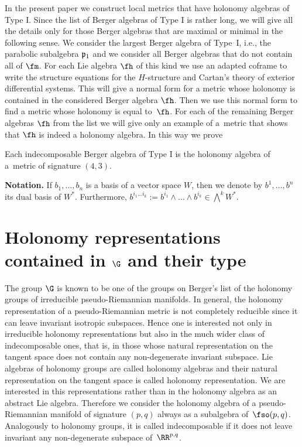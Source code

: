 In the present paper we construct local metrics that have holonomy algebras of Type I. Since the list of Berger algebras of Type I is rather long, we will give all the details only for those Berger algebras that are maximal or minimal in the following sense. We consider the largest Berger algebra of Type~I, i.e., the parabolic subalgebra $\frak p_1$ and we consider all Berger algebras that do not contain all of $\fm$. For each Lie algebra $\fh$ of this kind we use an adapted coframe to write the structure equations for the $H$-structure and Cartan's theory of exterior differential systems. This will give a normal form for a metric whose holonomy is contained in the considered Berger algebra $\fh$. Then we use this normal form to find a metric whose holonomy is equal to~$\fh$. For each of the remaining Berger algebras $\fh$ from the list we will give only an example of a~metric that shows that $\fh$ is indeed a holonomy algebra. In this way we prove
\begin{Theorem}\label{T}
Each indecomposable Berger algebra of Type I is the holonomy algebra of a~metric of signature $(4,3)$.
\end{Theorem}

\noindent
{\bf Notation.} If $b_1,\dots,b_n$ is a basis of a vector space $W$, then we denote by $b^1,\dots,b^n$ its dual basis of $W^*$. Furthermore, $b^{i_1\dots i_k}:=b^{i_1}\wedge\dots\wedge b^{i_k}\in\bigwedge^k W^*$.

\section[Holonomy representations contained in $\G$ and their type]{Holonomy representations contained in $\boldsymbol{\G}$ and their type}

The group $\G$ is known to be one of the groups on Berger's list of the holonomy groups of irreducible pseudo-Riemannian manifolds. In general, the holonomy representation of a pseudo-Riemannian metric is not completely reducible since it can leave invariant isotropic subspaces. Hence one is interested not only in irreducible holonomy representations but also in the much wider class of indecomposable ones, that is, in those whose natural representation on the tangent space does not contain any non-degenerate invariant subspace. Lie algebras of holonomy groups are called holonomy algebras and their natural representation on the tangent space is called holonomy representation. We are interested in this representations rather than in the holonomy algebra as an abstract Lie algebra. Therefore we consider the holonomy algebra of a pseudo-Riemannian manifold of signature $(p,q)$ always as a subalgebra of~$\fso(p,q)$. Analogously to holonomy groups, it is called indecomposable if it does not leave invariant any non-degenerate subspace of~$\RR^{p,q}$.

